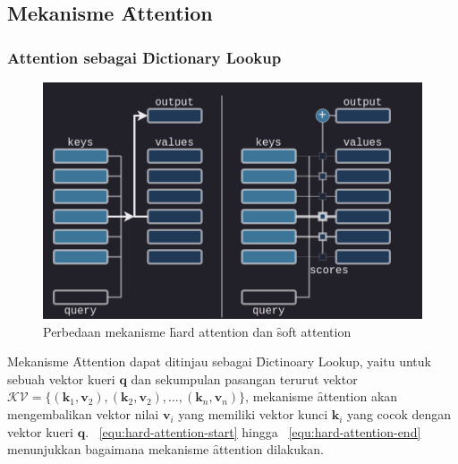 \chapter{\babTiga}
\label{bab:3}

\noindent{}

\section{Mekanisme \f{Attention}}
	\subsection{Attention sebagai \f{Dictionary Lookup}}

	\begin{figure}
		\centering
		\includegraphics[width=1\textwidth]{assets/pics/hard-soft-attention-diff.png}
		\caption{Perbedaan mekanisme \f{hard attention} dan \f{soft attention} \citep{pi-tau2023transformer}}
		\label{fig:hard-attention}
	\end{figure}

	Mekanisme \f{Attention} dapat ditinjau sebagai \f{Dictinoary Lookup}, yaitu untuk sebuah vektor kueri $\mathbf{q}$ dan sekumpulan pasangan terurut vektor $\mathcal{KV} = \{(\mathbf{k}_1, \mathbf{v}_2), (\mathbf{k}_2, \mathbf{v}_2), \dots, (\mathbf{k}_n, \mathbf{v}_n)\}$, mekanisme \f{attention} akan mengembalikan vektor nilai $\mathbf{v}_i$ yang memiliki vektor kunci $\mathbf{k}_i$ yang cocok dengan vektor kueri $\mathbf{q}$. \equ~\ref{equ:hard-attention-start} hingga \equ~\ref{equ:hard-attention-end} menunjukkan bagaimana mekanisme \f{attention} dilakukan.

